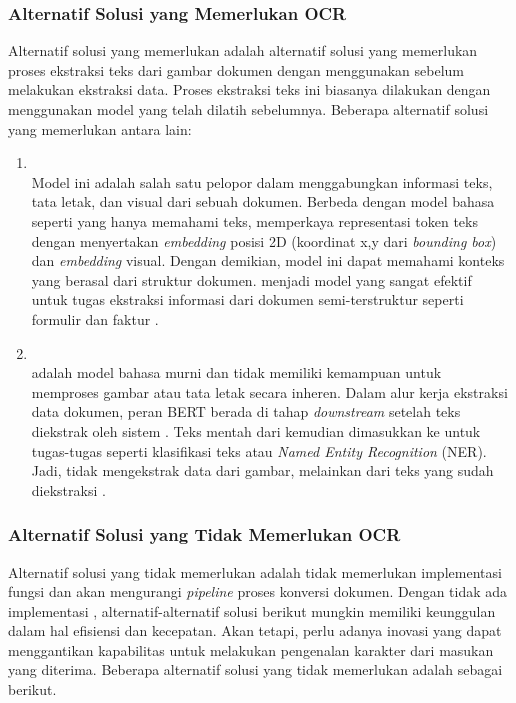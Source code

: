 \subsubsection{Alternatif Solusi yang Memerlukan OCR}
\label{subsubsec:alternatif-solusi-memerlukan-ocr}
Alternatif solusi yang memerlukan \ocr{} adalah alternatif solusi yang memerlukan proses ekstraksi teks dari gambar dokumen dengan menggunakan \ocr{} sebelum melakukan ekstraksi data. Proses ekstraksi teks ini biasanya dilakukan dengan menggunakan model \ocr{} yang telah dilatih sebelumnya. Beberapa alternatif solusi yang memerlukan \ocr{} antara lain:
\begin{enumerate}
    \item \layoutlm ~\\ Model ini adalah salah satu pelopor dalam menggabungkan informasi teks, tata letak, dan visual dari sebuah dokumen. Berbeda dengan model bahasa seperti \bert{} yang hanya memahami teks, \layoutlm{} memperkaya representasi token teks dengan menyertakan \textit{embedding} posisi 2D (koordinat x,y dari \emph{bounding box}) dan \textit{embedding} visual. Dengan demikian, model ini dapat memahami konteks yang berasal dari struktur dokumen. \layoutlm{} menjadi model yang sangat efektif untuk tugas ekstraksi informasi dari dokumen semi-terstruktur seperti formulir dan faktur \parencite{xu2020layoutlm}. 
    \item \bert{} ~\\
    \bert{} adalah model bahasa murni dan tidak memiliki kemampuan untuk memproses gambar atau tata letak secara inheren. Dalam alur kerja ekstraksi data dokumen, peran BERT berada di tahap \textit{downstream} setelah teks diekstrak oleh sistem \ocr. Teks mentah dari \ocr{} kemudian dimasukkan ke \bert{} untuk tugas-tugas \nlp{} seperti klasifikasi teks atau \emph{Named Entity Recognition} (NER). Jadi, \bert{} tidak mengekstrak data dari gambar, melainkan dari teks yang sudah diekstraksi \parencite{koroteev2021bert}. 
\end{enumerate}

\subsubsection{Alternatif Solusi yang Tidak Memerlukan OCR}
\label{subsubsec:alternatif-solusi-tidak-memerlukan-ocr}
Alternatif solusi yang tidak memerlukan \ocr{} adalah tidak memerlukan implementasi fungsi \ocr{} dan akan mengurangi \emph{pipeline} proses konversi dokumen. Dengan tidak ada implementasi \ocr, alternatif-alternatif solusi berikut mungkin memiliki keunggulan dalam hal efisiensi dan kecepatan. Akan tetapi, perlu adanya inovasi yang dapat menggantikan  kapabilitas \ocr{} untuk melakukan pengenalan karakter dari masukan yang diterima. Beberapa alternatif solusi yang tidak memerlukan \ocr{} adalah sebagai berikut.

